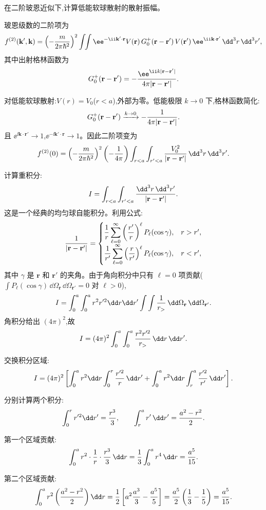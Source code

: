 \begin{question}
在二阶玻恩近似下,计算低能软球散射的散射振幅。
\end{question}
\begin{solution}
玻恩级数的二阶项为
\[
f^{(2)}(\mathbf k',\mathbf k)=\left(-{m\over2\pi\hbar^2}\right)^2
\int\!\!\int \ee^{-\ii\mathbf k'\cdot\mathbf r}
V(\mathbf r)\,G_0^+(\mathbf r-\mathbf r')\,V(\mathbf r')\,\ee^{\ii\mathbf k\cdot\mathbf r'}\,\dd^3r\,\dd^3r',
\]
其中出射格林函数为
\[
G_0^+(\mathbf r-\mathbf r')=-{\ee^{\ii k|\mathbf r-\mathbf r'|}\over4\pi|\mathbf r-\mathbf r'|}.
\]

对低能软球散射:$V(r)=V_0$($r<a$),外部为零。低能极限 $k\to0$ 下,格林函数简化:
\[
G_0^+(\mathbf r-\mathbf r')\xrightarrow{k\to0}-{1\over4\pi|\mathbf r-\mathbf r'|}.
\]
且 $\ee^{\ii\mathbf k\cdot\mathbf r'}\to1$,$\ee^{-\ii\mathbf k'\cdot\mathbf r}\to1$。因此二阶项变为
\[
f^{(2)}(0)=\left(-{m\over2\pi\hbar^2}\right)^2\left(-{1\over4\pi}\right)
\int_{r<a}\int_{r'<a}{V_0^2\over|\mathbf r-\mathbf r'|}\,\dd^3r\,\dd^3r'.
\]

计算重积分:
\[
I=\int_{r<a}\int_{r'<a}{\dd^3r\,\dd^3r'\over|\mathbf r-\mathbf r'|}.
\]
这是一个经典的均匀球自能积分。利用公式:
\[
{1\over|\mathbf r-\mathbf r'|}=
\begin{cases}
\displaystyle{1\over r}\sum_{\ell=0}^{\infty}\left({r'\over r}\right)^\ell P_\ell(\cos\gamma), & r>r',\\[8pt]
\displaystyle{1\over r'}\sum_{\ell=0}^{\infty}\left({r\over r'}\right)^\ell P_\ell(\cos\gamma), & r<r',
\end{cases}
\]
其中 $\gamma$ 是 $\mathbf r$ 和 $\mathbf r'$ 的夹角。由于角向积分中只有 $\ell=0$ 项贡献($\int P_\ell(\cos\gamma)\,\dd\Omega_{\mathbf r}\,\dd\Omega_{\mathbf r'}=0$ 对 $\ell>0$),
\[
I=\int_0^a\int_0^a r^2r'^2\dd r\dd r'\int\int{1\over r_>}\,\dd\Omega_{\mathbf r}\,\dd\Omega_{\mathbf r'}.
\]
角积分给出 $(4\pi)^2$,故
\[
I=(4\pi)^2\int_0^a\int_0^a{r^2r'^2\over r_>}\,\dd r\,\dd r'.
\]

交换积分区域:
\[
I=(4\pi)^2\left[\int_0^a r^2\dd r\int_0^r{r'^2\over r}\,\dd r'
+\int_0^a r^2\dd r\int_r^a{r'^2\over r'}\,\dd r'\right].
\]

分别计算两个积分:
\[
\int_0^r r'^2\dd r'={r^3\over3},\qquad
\int_r^a r'\,\dd r'={a^2-r^2\over2}.
\]

第一个区域贡献:
\[
\int_0^a r^2\cdot{1\over r}\cdot{r^3\over3}\,\dd r={1\over3}\int_0^a r^4\,\dd r={a^5\over15}.
\]

第二个区域贡献:
\[
\int_0^a r^2\left({a^2-r^2\over2}\right)\dd r
={1\over2}\left[a^2{a^3\over3}-{a^5\over5}\right]
={a^5\over2}\left({1\over3}-{1\over5}\right)={a^5\over15}.
\]


\end{solution}
